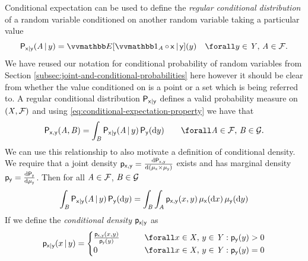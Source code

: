 Conditional expectation can be used to define the \emph{regular conditional distribution} of a random variable conditioned on another random variable taking a particular value
\begin{equation}\label{eq:regular-conditional-probability}
  \prob{\rvar{x}|\rvar{y}}(\set{A} \gvn y) = \expc{\ind{\set{A}}\circ\,\rvar{x} \gvn \rvar{y}}(y)
  \quad\forall y \in \set{Y},\,\set{A} \in \sset{F}.
\end{equation}
We have reused our notation for conditional probability of random variables from Section \ref{subsec:joint-and-conditional-probabilities} here however it should be clear from whether the value conditioned on is a point or a set which is being referred to. A regular conditional distribution $\mathsf{P}_{\mathsf{x}|\mathsf{y}}$ defines a valid probability measure on $(\mathit{X},\mathcal{F})$ and using \eqref{eq:conditional-expectation-property} we have that
\begin{equation}\label{eq:regular-conditional-probability-joint-relationship}
  \prob{\rvar{x},\rvar{y}}(\set{A},\set{B}) =
  \int_{\set{B}} \prob{\rvar{x}|\rvar{y}}(\set{A}\gvn y) \,\prob{\rvar{y}}(\dr y)
  \qquad \forall \set{A} \in \sset{F},\,\set{B} \in \sset{G}.
\end{equation}
We can use this relationship to also motivate a definition of conditional density. We require that a joint density $\mathsf{p}_{\mathsf{x},\mathsf{y}} = \frac{\mathrm{d} \mathsf{P}_{\mathsf{x},\mathsf{y}}}{\mathrm{d} (\mu_{\mathsf{x}}\times\mu_{\mathsf{y}})}$ exists and has marginal density $\mathsf{p}_{\mathsf{y}} = \frac{\mathrm{d} \mathsf{P}_{\mathsf{y}}}{\mathrm{d} \mu_{\mathsf{y}}}$. Then for all $\mathit{A} \in \mathcal{F}$, $\mathit{B} \in \mathcal{G}$
\begin{equation}\label{eq:conditional-density-derivation-1}
  \int_{\mathit{B}} \mathsf{P}_{\mathsf{x}|\mathsf{y}}(\mathit{A}\operatorname{|} y) \,\mathsf{P}_{\mathsf{y}}(\mathrm{d} y)
  =
  \int_{\mathit{B}}\int_{\mathit{A}} 
    \mathsf{p}_{\mathsf{x},\mathsf{y}}(x,y)
  \,\mu_{\mathsf{x}}(\mathrm{d} x)\,\mu_{\mathsf{y}}(\mathrm{d} y)
\end{equation}
If we define the \emph{conditional density} $\mathsf{p}_{\mathsf{x}|\mathsf{y}}$ as
\begin{equation}\label{eq:conditional-density-definition}
  \pden{\rvar{x}|\rvar{y}}(x\gvn y) =
  \begin{cases}
    \frac{\pden{\rvar{x},\rvar{y}}(x,y)}{\pden{\rvar{y}}(y)} 
    &\qquad \forall x\in\set{X},\, y \in \set{Y} : \pden{\rvar{y}}(y) > 0\\
    0
    &\qquad \forall x\in\set{X},\,y \in \set{Y} : \pden{\rvar{y}}(y) = 0
  \end{cases}
\end{equation}
